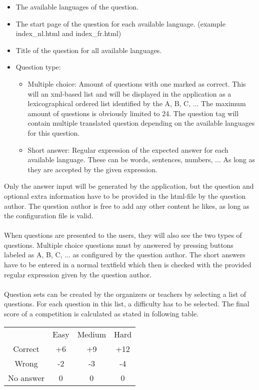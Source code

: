 	\begin{itemize}
		\item The available languages of the question.
		\item The start page of the question for each available language.
		(example index\_nl.html and index\_fr.html)
  		\item Title of the question for all available languages.
  		\item Question type:
  		\begin{itemize}
  			\item Multiple choice: Amount of questions with one marked as correct.
  			This will an xml-based list and will be displayed in the application as a
  			lexicographical ordered list identified by the A, B, C, ...
  			The maximum amount of questions is obviously limited to 24.
  			The question tag will contain multiple translated question depending on the
  			available languages for this question.
  			\item Short answer: Regular expression of the expected answer for each
  			available language. These can be words, sentences, numbers, ... As long as
  			they are accepted by the given expression.
  		\end{itemize}
	\end{itemize}
	Only the answer input will be generated by the application, but the question and
	optional extra information have to be provided in the html-file by the question author.
	The question author is free to add any other content he likes, as long as the
	configuration file is valid. \\
	\\
	When questions are presented to the users, they will also see the two types of
	questions. Multiple choice questions must by answered by pressing buttons labeled as
	A, B, C, ... as configured by the question author. The short answers have to be
	entered in a normal textfield which then is checked with the provided regular
	expression given by the question author.\\
	\\
	Question sets can be created by the organizers or teachers by selecting a list of questions.
	For each question in this list, a difficulty has to be selected. The final score of a
	competition is calculated as stated in following table.
	\begin{tabular}{ c c c c }
	  & Easy & Medium & Hard \\
	  Correct & +6 & +9 & +12 \\
	  Wrong & -2 & -3 & -4 \\
	  No answer & 0 & 0 & 0 \\
	\end{tabular}
